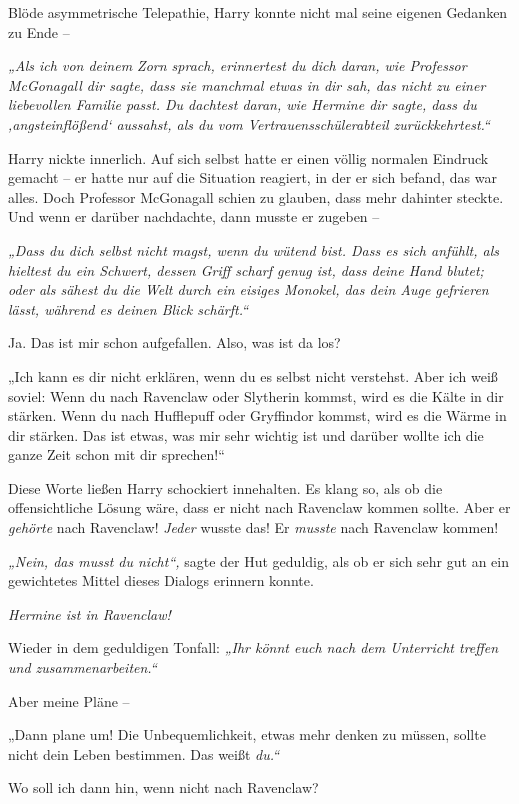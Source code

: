 {Blöde asymmetrische Telepathie, Harry konnte nicht mal seine eigenen Gedanken zu Ende --

\emph{„Als ich von deinem Zorn sprach, erinnertest du dich daran, wie Professor McGonagall dir sagte, dass sie manchmal etwas in dir sah, das nicht zu einer liebevollen Familie passt. Du dachtest daran, wie Hermine dir sagte, dass du ‚angsteinflößend` aussahst, als du vom Vertrauensschülerabteil zurückkehrtest.“}

Harry nickte innerlich. Auf sich selbst hatte er einen völlig normalen Eindruck gemacht -- er hatte nur auf die Situation reagiert, in der er sich befand, das war alles. Doch Professor McGonagall schien zu glauben, dass mehr dahinter steckte. Und wenn er darüber nachdachte, dann musste er zugeben --

\emph{„Dass du dich selbst nicht magst, wenn du wütend bist. Dass es sich anfühlt, als hieltest du ein Schwert, dessen Griff scharf genug ist, dass deine Hand blutet; oder als sähest du die Welt durch ein eisiges Monokel, das dein Auge gefrieren lässt, während es deinen Blick schärft.“}

Ja. Das ist mir schon aufgefallen. Also, was ist da los?

„Ich kann es dir nicht erklären, wenn du es selbst nicht verstehst. Aber ich weiß soviel: Wenn du nach Ravenclaw oder Slytherin kommst, wird es die Kälte in dir stärken. Wenn du nach Hufflepuff oder Gryffindor kommst, wird es die Wärme in dir stärken. Das ist etwas, was mir sehr wichtig ist und darüber wollte ich die ganze Zeit schon mit dir sprechen!“

Diese Worte ließen Harry schockiert innehalten. Es klang so, als ob die offensichtliche Lösung wäre, dass er nicht nach Ravenclaw kommen sollte. Aber er \emph{gehörte} nach Ravenclaw! \emph{Jeder} wusste das! Er \emph{musste} nach Ravenclaw kommen!

\emph{„Nein, das musst du nicht“,} sagte der Hut geduldig, als ob er sich sehr gut an ein gewichtetes Mittel dieses Dialogs erinnern konnte.

\emph{Hermine ist in Ravenclaw!}

Wieder in dem geduldigen Tonfall: \emph{„Ihr könnt euch nach dem Unterricht treffen und zusammenarbeiten.“}

Aber meine Pläne --

„Dann plane um! Die Unbequemlichkeit, etwas mehr denken zu müssen, sollte nicht dein Leben bestimmen. Das weißt \emph{du.“}

Wo soll ich dann hin, wenn nicht nach Ravenclaw?

}
